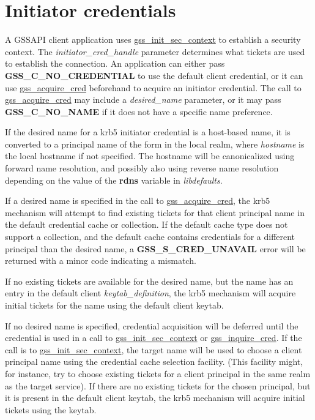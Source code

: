 \documentclass[letterpaper,10pt,english]{sphinxmanual}
\begin{document}
\section{Initiator credentials}
\label{appdev/gssapi:initiator-credentials}
A GSSAPI client application uses \href{http://tools.ietf.org/html/rfc2744.html\#section-5.19}{gss\_init\_sec\_context} to establish a
security context.  The \emph{initiator\_cred\_handle} parameter determines
what tickets are used to establish the connection.  An application can
either pass \textbf{GSS\_C\_NO\_CREDENTIAL} to use the default client
credential, or it can use \href{http://tools.ietf.org/html/rfc2744.html\#section-5.2}{gss\_acquire\_cred} beforehand to acquire an
initiator credential.  The call to \href{http://tools.ietf.org/html/rfc2744.html\#section-5.2}{gss\_acquire\_cred} may include a
\emph{desired\_name} parameter, or it may pass \textbf{GSS\_C\_NO\_NAME} if it does
not have a specific name preference.

If the desired name for a krb5 initiator credential is a host-based
name, it is converted to a principal name of the form
 in the local realm, where \emph{hostname} is the local
hostname if not specified.  The hostname will be canonicalized using
forward name resolution, and possibly also using reverse name
resolution depending on the value of the \textbf{rdns} variable in
\emph{libdefaults}.

If a desired name is specified in the call to \href{http://tools.ietf.org/html/rfc2744.html\#section-5.2}{gss\_acquire\_cred}, the
krb5 mechanism will attempt to find existing tickets for that client
principal name in the default credential cache or collection.  If the
default cache type does not support a collection, and the default
cache contains credentials for a different principal than the desired
name, a \textbf{GSS\_S\_CRED\_UNAVAIL} error will be returned with a minor
code indicating a mismatch.

If no existing tickets are available for the desired name, but the
name has an entry in the default client \emph{keytab\_definition}, the
krb5 mechanism will acquire initial tickets for the name using the
default client keytab.

If no desired name is specified, credential acquisition will be
deferred until the credential is used in a call to
\href{http://tools.ietf.org/html/rfc2744.html\#section-5.19}{gss\_init\_sec\_context} or \href{http://tools.ietf.org/html/rfc2744.html\#section-5.21}{gss\_inquire\_cred}.  If the call is to
\href{http://tools.ietf.org/html/rfc2744.html\#section-5.19}{gss\_init\_sec\_context}, the target name will be used to choose a client
principal name using the credential cache selection facility.  (This
facility might, for instance, try to choose existing tickets for a
client principal in the same realm as the target service).  If there
are no existing tickets for the chosen principal, but it is present in
the default client keytab, the krb5 mechanism will acquire initial
tickets using the keytab.
\end{document}
